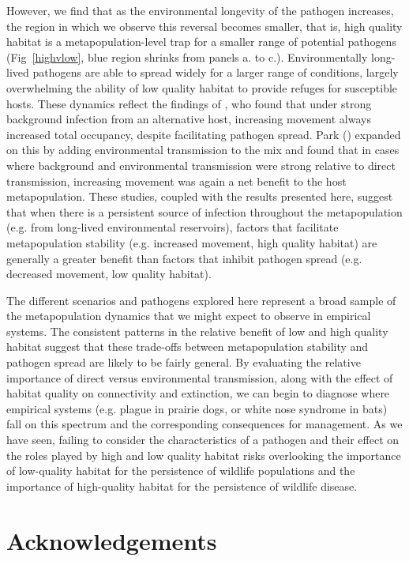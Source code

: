 \documentclass{article}
\begin{document}
However, we find that as the environmental longevity of the pathogen increases, the region in which we observe this reversal becomes smaller, that is, high quality habitat is a metapopulation-level trap for a smaller range of potential pathogens (Fig~\ref{highvlow}, blue region shrinks from panels a. to c.).  
Environmentally long-lived pathogens are able to spread widely for a larger range of conditions, largely overwhelming the ability of low quality habitat to provide refuges for susceptible hosts. 
These dynamics reflect the findings of \cite{Gog2002}, who found that under strong background infection from an alternative host, increasing movement always increased total occupancy, despite facilitating pathogen spread.  
Park (\cite{Park2012}) expanded on this by adding environmental transmission to the mix and found that in cases where background and environmental transmission were strong relative to direct transmission, increasing movement was again a net benefit to the host metapopulation.  
These studies, coupled with the results presented here, suggest that when there is a persistent source of infection throughout the metapopulation (e.g. from long-lived environmental reservoirs), factors that facilitate metapopulation stability (e.g. increased movement, high quality habitat) are generally a greater benefit than factors that inhibit pathogen spread (e.g. decreased movement, low quality habitat). 

The different scenarios and pathogens explored here represent a broad sample of the metapopulation dynamics that we might expect to observe in empirical systems.
The consistent patterns in the relative benefit of low and high quality habitat suggest that these trade-offs between metapopulation stability and pathogen spread are likely to be fairly general.  
By evaluating the relative importance of direct versus environmental transmission, along with the effect of habitat quality on connectivity and extinction, we can begin to diagnose where empirical systems (e.g. plague in prairie dogs, or white nose syndrome in bats) fall on this spectrum and the corresponding consequences for management.
As we have seen, failing to consider the characteristics of a pathogen and their effect on the roles played by high and low quality habitat risks overlooking the importance of low-quality habitat for the persistence of wildlife populations and the importance of high-quality habitat for the persistence of wildlife disease.

\section{Acknowledgements}
\end{document}
